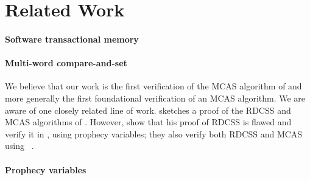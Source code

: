 \section{Related Work}

\paragraph{Software transactional memory}




\paragraph{Multi-word compare-and-set}


We believe that our work is the first verification of the MCAS algorithm of \citet{DBLP:conf/wdag/GuerraouiKMZ20} and more generally the first foundational verification of an MCAS algorithm.
We are aware of one closely related line of work.
 sketches a proof of the RDCSS and MCAS algorithms of \citet{DBLP:conf/wdag/HarrisFP02}.
However, \citet{DBLP:journals/pacmpl/JungLPRTDJ20} show that his proof of RDCSS is flawed and verify it in \Iris, using prophecy variables; they also verify both RDCSS and MCAS using \VeriFast~\citep{DBLP:conf/nfm/JacobsSPVPP11}.

\paragraph{Prophecy variables}

